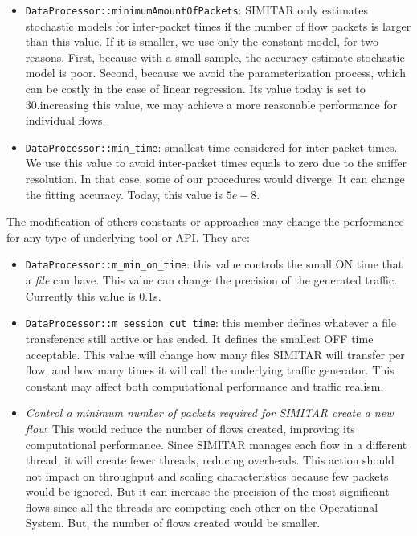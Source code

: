 \begin{itemize}
	\item \texttt{DataProcessor::minimumAmountOfPackets}: SIMITAR only estimates stochastic models for inter-packet times if the number of flow packets is larger than this value. If it is smaller, we use only the constant model, for two reasons. First, because with a small sample, the accuracy estimate stochastic model is poor. Second, because we avoid the parameterization process, which can be costly in the case of linear regression. Its value today is set to 30.increasing this value, we may achieve a more reasonable performance for individual flows. 
	\item \texttt{DataProcessor::min\_time}: smallest time considered for inter-packet times. We use this value to avoid inter-packet times equals to zero due to the sniffer resolution. In that case, some of our procedures would diverge. It can change the fitting accuracy. Today, this value is $5e-8$. 
\end{itemize}

The modification of others  constants or approaches may change the performance for any type of underlying tool or API. They are:

\begin{itemize}

	\item \texttt{DataProcessor::m\_min\_on\_time}: this value controls the small ON time that a \textit{file} can have. This value  can change the precision of the generated traffic. Currently this value is $0.1$s. 

	\item \texttt{DataProcessor::m\_session\_cut\_time}: this member defines whatever a file transference still active or has ended. It defines the smallest OFF time acceptable. This value will change how many files SIMITAR will transfer per flow, and how many times it will call the underlying traffic generator. This constant may affect both computational performance and traffic realism.

	\item \textit{Control a minimum number of packets required for SIMITAR create a new flow}: This would reduce the number of flows created, improving its computational performance. Since SIMITAR manages each flow in a  different thread, it will create fewer threads, reducing overheads. This action should not impact  on throughput and scaling characteristics because few packets would be ignored. But it can increase the precision of the most significant flows since all the threads are competing each other on the Operational System. But, the number of flows created would be smaller.
	
\end{itemize}



